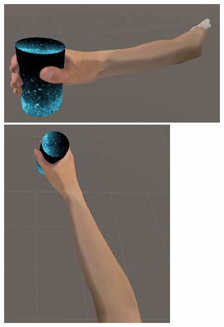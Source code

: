 \documentclass{ltjsreport}
\begin{document}
		\begin{figure}[H]
		\centering
		\begin{minipage}{0.4\columnwidth}
		\centering
		\includegraphics[width = \columnwidth]{../figs/grapcylinder_side.png}
		\end{minipage}
		\hspace{0.04\columnwidth}
		\begin{minipage}{0.4\columnwidth}
		\centering
		\includegraphics[width = \columnwidth]{../figs/grapcylinder_up.png}
		\end{minipage}
		\caption{}
		\end{figure}
\end{document}
